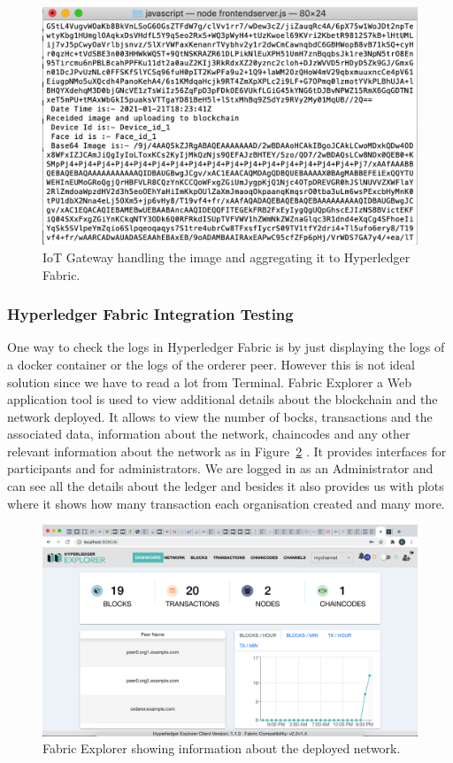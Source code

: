 \begin{figure}[!htb]
    \centering
    \includegraphics[width=1\textwidth]{figures/nodejs.png}
    \caption{IoT Gateway handling the image and aggregating it to Hyperledger Fabric.}
    \label{fig:nodejs}
\end{figure}

\subsubsection{Hyperledger Fabric Integration Testing}

One way to check the logs in Hyperledger Fabric is by just displaying the logs of a docker container or the logs of the orderer peer. However this is not ideal solution since we have to read a lot from Terminal. Fabric Explorer a Web application tool is used to view additional details about the blockchain and the network deployed. It allows to view the number of bocks, transactions and the associated data, information about the network, chaincodes and any other relevant information about the network as in Figure~\ref{fig:fabric_explorer} . It provides interfaces for participants and for administrators. We are logged in as an Administrator and can see all the details about the ledger and besides it also provides us with plots where it shows how many transaction each organisation created and many more. 


\begin{figure}[!htb]
    \centering
    \includegraphics[width=1\textwidth]{figures/explorer_overall.png}
    \caption{Fabric Explorer showing information about the deployed network.}
    \label{fig:fabric_explorer}
\end{figure}

